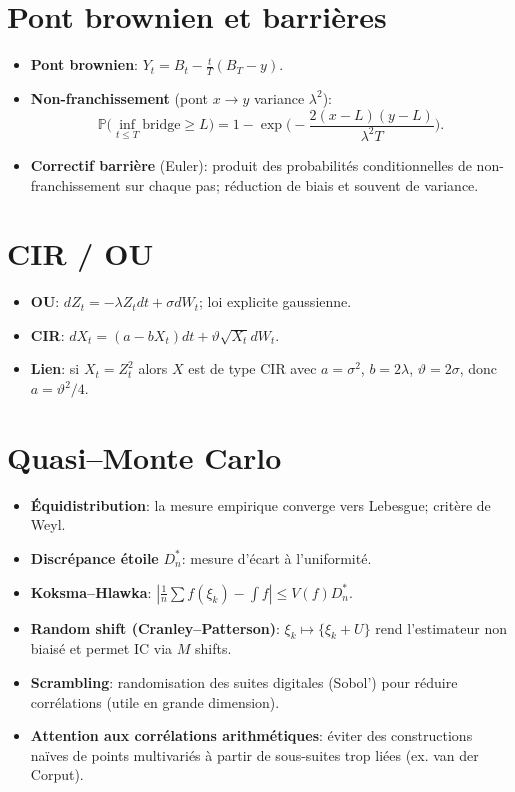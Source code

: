 \documentclass[11pt,a4paper]{article}
\newcommand{\Pp}{\mathbb{P}}
\newcommand{\1}{\mathbbm{1}}
\theoremstyle{plain}
\theoremstyle{definition}
\begin{document}
\section{Pont brownien et barrières}
\begin{itemize}[leftmargin=*]
  \item \textbf{Pont brownien}: $Y_t=B_t-\frac{t}{T}(B_T-y)$.
  \item \textbf{Non-franchissement} (pont $x\to y$ variance $\lambda^2$):
  \[
  \Pp\Big(\inf_{t\le T} \text{bridge}\ge L\Big)
  =1-\exp\!\Big(-\frac{2(x-L)(y-L)}{\lambda^2T}\Big).
  \]
  \item \textbf{Correctif barrière} (Euler): produit des probabilités conditionnelles de non-franchissement sur chaque pas; réduction de biais et souvent de variance.
\end{itemize}

\section{CIR / OU}
\begin{itemize}[leftmargin=*]
  \item \textbf{OU}: $dZ_t=-\lambda Z_tdt+\sigma dW_t$; loi explicite gaussienne.
  \item \textbf{CIR}: $dX_t=(a-bX_t)dt+\vartheta\sqrt{X_t}dW_t$.
  \item \textbf{Lien}: si $X_t=Z_t^2$ alors $X$ est de type CIR avec $a=\sigma^2$, $b=2\lambda$, $\vartheta=2\sigma$, donc $a=\vartheta^2/4$.
\end{itemize}

\section{Quasi--Monte Carlo}
\begin{itemize}[leftmargin=*]
  \item \textbf{Équidistribution}: la mesure empirique converge vers Lebesgue; critère de Weyl.
  \item \textbf{Discrépance étoile} $D_n^*$: mesure d'écart à l'uniformité.
  \item \textbf{Koksma--Hlawka}: $|\frac1n\sum f(\xi_k)-\int f|\le V(f)D_n^*$.
  \item \textbf{Random shift (Cranley--Patterson)}: $\xi_k\mapsto\{\xi_k+U\}$ rend l'estimateur non biaisé et permet IC via $M$ shifts.
  \item \textbf{Scrambling}: randomisation des suites digitales (Sobol') pour réduire corrélations (utile en grande dimension).
  \item \textbf{Attention aux corrélations arithmétiques}: éviter des constructions naïves de points multivariés à partir de sous-suites trop liées (ex. van der Corput).
\end{itemize}
\end{document}
